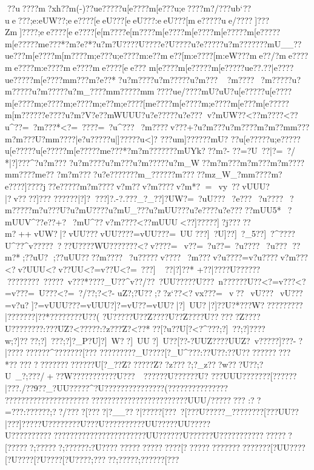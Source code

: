{{{{??u?? ?}?m?xh?}?m(-)??u{e?????u[e????{m[e???u;e????{m?/???{ub`??ue???;e:eUW??;ee????[eeU???[eeU???:eeU???[me?????ue/????}] ???Zm]????;ee????[ee????[e[m????{e[m????{m[e????{m[e????{m[e?????m[e?????m[e?????m{e???*?m?e?*  ?u?m?U???}?U ????e?}U????u?e?????u?m???????mU__??u{e???{m[e????{m[m????{m;e???u;e????{m:e??{me??[m:e????[m:eW???{me??/?{me????{me????{m:e????{me????{me????[ee???
{m[e????{m[e?????m[e?????u{e??.??}|e????u{e?????m[e??? ?m{m??  ?m?e??*?u?m????u?m?????u?m???
~?m????~?m?????u?m?????u?m?????u?m_????m{m?????m{m????u{e/????}{mU?uU?u[e?????u[e????{m[e????{m;e????{m;e????{m;e??{m;e????[m{e????{m[e????{m;e????{m[e???m[e?????m[m?????}?e????u?m?V?e?}?mWUUU?u?e?????u?e???v?mUW??<??m????<??u^??=~?m???*<?=~????=~?u^???~?m????\?v???+?u?m???u?m????m?m? ?m{m???{m?m???U?m{m????|e?u?????u|]?????u<]?
???u{m]??????mU?	??u[e?????u;e?????u[e?????u[e?????m[e?????m{e???*?m?m???????mUYk???m?-%
??=?U~??|?=~?/
*|?]?? ?^?u?m??? ?u?m??? ?u?m?? ?u?m?????u?m_W??m?m??  ?m?m??  ?m?m??? ?m{m??? ?m{e??
 ?m?m????u?e???????m_??????m????}?mz_W_?m{m??? ?m?e??? ?]?}???j??e?????m?m????v?m??v?m????v?m*?
=~v}y~?}?vUUU?|?v????]???
 ??}? ???|?]? ???]?.-?.??}?_?_ ??]?UW? =~?uU???~?e??? ~?u????~?m?????m?u???U?u?mU????u?mU_???u?mUU???u?e????u?e????}?mUU5*~?mUUV^?}?e??+?~?mU^??v?m????<??mUUU<??]?????]?j?????m?++\?vUW?|?vUU? ??vUU????=vUU? ??=~UU???]~?U]?}?]~?_5?}?]~ ?^?}?}? ?U^??^v ?????~???U??}? ?WU??}?????<?v????=~v??=~?u??=~?u????~?u??? ??m?*;??uU?
;??uUU????m????~?u?????}v????~?m???v?u????=v?u????v?m??? <?v?UUU<?v??UU<?=v? ?U<?=~???}\?]~
??|?]??*
+??|????U??}??????}? ?????~? ????~v???*??}??_U ??^v??/ ??~?UU? ????U?? ?~n??? ???U?? <?=v??? <?=v??? \?=~U???<?=~?/??;?<?-
uZ?;?U??;??z`??<?vx???=~v?? }~vU???}~vU???=v?u?   ]?=vUUU???=vUUU?]?=vU}??\?=vUU?|?]~UU?|?]??U?*??}?W? ??}???????|???????|??*????{????U?{?(
?U??{?? ?U??Z????U??Z????U???  ???Z????U????  ????:? ??UZ?<?????:?\?z???Z?<??*?{?[?u??U[?<?^???;?]~?  ?;?]????w;?]????;?]~? ??;?]?_P?U]?]~W??\?]~UU?\?]~U}??[?}?-?UUZ?}???UUZ?~v????{?]???-{?|??????}????^{???  ????[???
??{??????{?_U????[?_U^???:??U?{?:??U  ?????? ?????* ???????????????????U[?_?   ?Z??????Z??z????;?_z???\?w???\?U??;?\?U~_?;?}??/+?}?W???\????? ???}?U???~~??  ????U?? ????U?
 \????UUU??}?????[??????|???./??9??_?UU?????^?U??? ?????? ??????(??????????????? 
???????????????????????????????????? ?????????UUU/????? ???  
 :??=???:??}????;??/????[?\W???|?__???|?????[???~? [???U?? {???_?? {?????? [???UU??|???]?? {???U???????  ?U???U?? ?????? {??UU?????UU?????U????????????????? ??????? ??????? {??UU??????U?? ????U?? ????????{???????[??????;??????;?????{?:?U???{????? {????? {????? [????  ????????????????[?UU????[?U?? ??[?U?? ??[?U?? ??;??? ??;???  ??;???? ??[???
}}}}}}}}}}}}}}}}}}}}}}}}}}}}}
